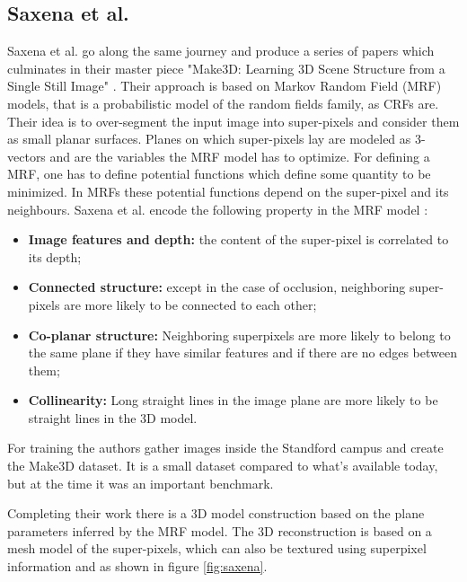 \subsection{Saxena et al.}
Saxena et al. go along the same journey and produce a series of papers \cite{saxena1, saxena2, saxena3, saxena4} which culminates in their master piece "Make3D: Learning 3D Scene Structure from a Single Still Image" \cite{saxena5}.
Their approach is based on Markov Random Field (MRF) models, that is a probabilistic model of the random fields family, as CRFs are.
Their idea is to over-segment the input image into super-pixels and consider them as small planar surfaces.
Planes on which super-pixels lay are modeled as 3-vectors and are the variables the MRF model has to optimize.
For defining a MRF, one has to define potential functions which define some quantity to be minimized.
In MRFs these potential functions depend on the super-pixel and its neighbours.
Saxena et al. encode the following property in the MRF model \cite{saxena5}:
\begin{itemize}
	\item{\textbf{Image features and depth:} the content of the super-pixel is correlated to its depth;}
	\item{\textbf{Connected structure:} except in the case of occlusion, neighboring super-pixels are more likely to be connected to each other;}
	\item{\textbf{Co-planar structure:} Neighboring superpixels are more likely to belong to the same plane if they have similar features and if there are no edges between them;}
	\item{\textbf{Collinearity:} Long straight lines in the image plane are more likely to be straight lines in the 3D model.}
\end{itemize}

For training the authors gather images inside the Standford campus and create the Make3D \cite{saxena5} dataset.
It is a small dataset compared to what's available today, but at the time it was an important benchmark.

Completing their work there is a 3D model construction based on the plane parameters inferred by the MRF model.
The 3D reconstruction is based on a mesh model of the super-pixels, which can also be textured using superpixel information and as shown in figure \ref{fig:saxena}.

